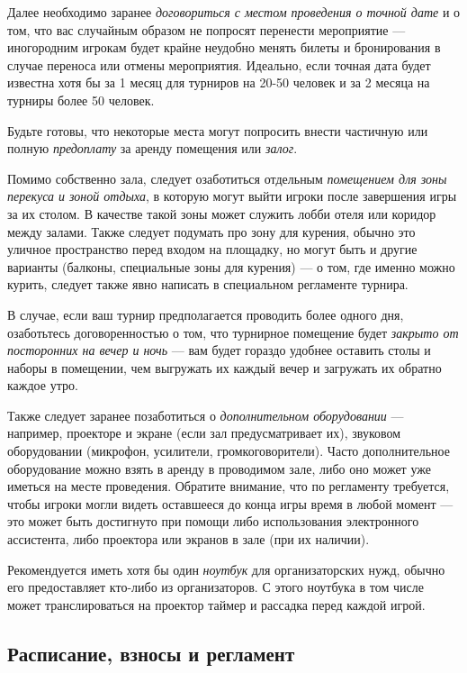 Далее необходимо заранее \textit{договориться с местом проведения о точной дате} и о том, что вас случайным образом не попросят перенести мероприятие --- иногородним игрокам будет крайне неудобно менять билеты и бронирования в случае переноса или отмены мероприятия. Идеально, если точная дата будет известна хотя бы за 1 месяц для турниров на 20-50 человек и за 2 месяца на турниры более 50 человек.

Будьте готовы, что некоторые места могут попросить внести частичную или полную \textit{предоплату} за аренду помещения или \textit{залог}.

Помимо собственно зала, следует озаботиться отдельным \textit{помещением для зоны перекуса и зоной отдыха}, в которую могут выйти игроки после завершения игры за их столом. В качестве такой зоны может служить лобби отеля или коридор между залами. Также следует подумать про зону для курения, обычно это уличное пространство перед входом на площадку, но могут быть и другие варианты (балконы, специальные зоны для курения) --- о том, где именно можно курить, следует также явно написать в специальном регламенте турнира.

В случае, если ваш турнир предполагается проводить более одного дня, озаботьтесь договоренностью о том, что турнирное помещение будет \textit{закрыто от посторонних на вечер и ночь} --- вам будет гораздо удобнее оставить столы и наборы в помещении, чем выгружать их каждый вечер и загружать их обратно каждое утро.

Также следует заранее позаботиться о \textit{дополнительном оборудовании} --- например, проекторе и экране (если зал предусматривает их), звуковом оборудовании (микрофон, усилители, громкоговорители). Часто дополнительное оборудование можно взять в аренду в проводимом зале, либо оно может уже иметься на месте проведения. Обратите внимание, что по регламенту требуется, чтобы игроки могли видеть оставшееся до конца игры время в любой момент --- это может быть достигнуто при помощи либо использования электронного ассистента, либо проектора или экранов в зале (при их наличии).

Рекомендуется иметь хотя бы один \textit{ноутбук} для организаторских нужд, обычно его предоставляет кто-либо из организаторов. С этого ноутбука в том числе может транслироваться на проектор таймер и рассадка перед каждой игрой.

\subsection{Расписание, взносы и регламент}

